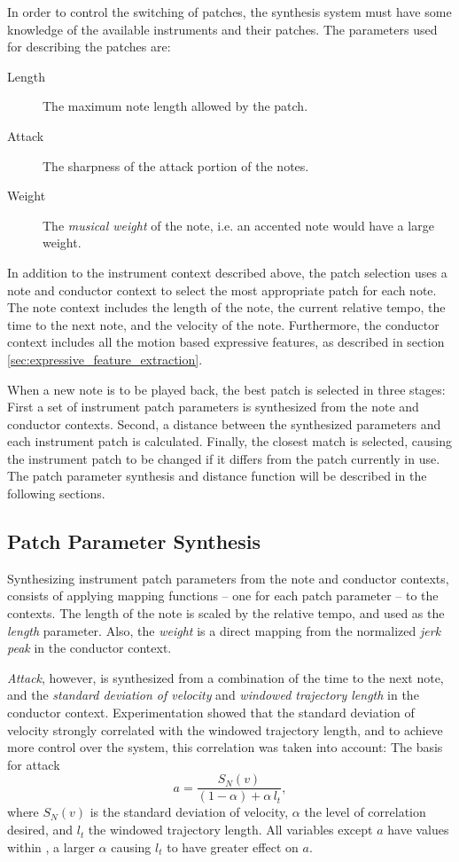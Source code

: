 In order to control the switching of patches,
the synthesis system must have some knowledge of
the available instruments and their patches.
The parameters used for describing the patches are:
\begin{description}
\item[Length] The maximum note length allowed by the patch.
\item[Attack] The sharpness of the attack portion of the notes.
\item[Weight] The \textit{musical weight} of the note, i.e. an accented note would have a large weight.
\end{description}

In addition to the instrument context described above,
the patch selection uses a note and conductor context
to select the most appropriate patch for each note.
The note context includes
the length of the note,
the current relative tempo,
the time to the next note,
and the velocity of the note.
Furthermore, the conductor context includes
all the motion based expressive features,
as described in section \ref{sec:expressive_feature_extraction}.

When a new note is to be played back,
the best patch is selected in three stages:
First a set of instrument patch parameters is
synthesized from the note and conductor contexts.
Second, a distance between the synthesized parameters
and each instrument patch is calculated.
Finally, the closest match is selected,
causing the instrument patch to be changed
if it differs from the patch currently in use.
The patch parameter synthesis and distance function
will be described in the following sections.

\subsection{Patch Parameter Synthesis}

Synthesizing instrument patch parameters
from the note and conductor contexts,
consists of applying mapping functions --
one for each patch parameter --
to the contexts.
The length of the note is
scaled by the relative tempo,
and used as the \textit{length} parameter.
Also, the \textit{weight} is a direct mapping
from the normalized \textit{jerk peak}
in the conductor context.

\textit{Attack}, however,
is synthesized from a combination
of the time to the next note,
and the \textit{standard deviation of velocity}
and \textit{windowed trajectory length}
in the conductor context.
Experimentation showed that
the standard deviation of velocity
strongly correlated with
the windowed trajectory length,
and to achieve more control over the system,
this correlation was taken into account:
The basis for attack
\begin{equation}
a = \frac{S_N(v)}{(1 - \alpha) + \alpha \, l_t},
\end{equation}
where $S_N(v)$ is the standard deviation of velocity,
$\alpha$ the level of correlation desired,
and $l_t$ the windowed trajectory length.
All variables except $a$
have values within ,
a larger $\alpha$ causing $l_t$ to have
greater effect on $a$.

